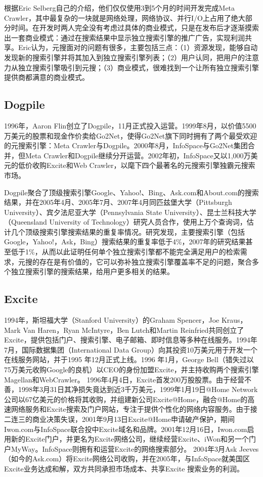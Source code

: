 根据Eric Selberg自己的介绍，他们仅仅使用3到5个月的时间开发完成Meta Crawler，其中最复杂的一块就是网络处理，网络协议、并行I/O上占用了绝大部分时间。在开发时两人完全没有考虑过具体的商业模式，只是在发布后才逐渐摸索出一套商业模式：通过在搜索结果中显示独立搜索引擎的推广广告，实现利润共享。Eric认为，元搜面对的问题有很多，主要包括三点：（1）资源发现，能够自动发现新的搜索引擎并将其加入到独立搜索引擎列表；（2）用户认同，把用户的注意力从独立搜索引擎吸引到元搜；（3）商业模式，很难找到一个让所有独立搜索引擎提供商都满意的商业模式。

\subsection{Dogpile}
1996年，Aaron Flin创立了Dogpile，11月正式投入运营。1999年8月，以价值5500万美元的股票和现金作价卖给Go2Net，使得Go2Net旗下同时拥有了两个最受欢迎的元搜索引擎：Meta Crawler与Dogpile。2000年8月，InfoSpace与Go2Net集团合并，但Meta Crawler和Dogpile继续分开运营。2002年初，InfoSpace又以1,000万美元的低价收购Excite和Web Crawler，以麾下四个最著名的元搜索引擎独霸元搜索市场。

Dogpile聚合了顶级搜索引擎Google、Yahoo!、Bing、Ask.com和About.com的搜索结果，并在2005年4月、2005年7月、2007年4月同匹兹堡大学（Pittsburgh University）、宾夕法尼亚大学（Pennsylvania State University）、昆士兰科技大学（Queensland University of Technology）研究人员合作，使用上万个查询词，估计几个顶级搜索引擎搜索结果的重复率情况。研究发现，主要搜索引擎（包括Google，Yahoo!，Ask，Bing）搜索结果的重复率低于4\%，2007年的研究结果甚至低于1\%，从而以此证明任何单个独立搜索引擎都不能完全满足用户的检索需求，元搜的存在是有价值的，它可以弥补独立搜索引擎覆盖率不足的问题，聚合多个独立搜索引擎的搜索结果，给用户更多相关的结果。

\subsection{Excite}
1994年，斯坦福大学（Stanford University）的Graham Spencer，Joe Kraus，Mark Van Haren，Ryan McIntyre，Ben Lutch和Martin Reinfried共同创立了Excite，提供包括门户、搜索引擎、电子邮箱、即时信息等多种在线服务。1994年7月，国际数据集团（International Data Group）向其投资10万美元用于开发一个在线服务网站，并于1995 年12月正式上线。1996 年1月，George Bell（错失过以75万美元收购Google的良机）以CEO的身份加盟Excite，并主持收购两个搜索引擎Magellan和WebCrawler。
1996年4月4日，Excite首发200万股股票。由于经营不善，1998年3月31日其净损失竟达到近3千万美元，1999年1月19日@Home Network公司以67亿美元的价格将其收购，并组建新公司Excite@Home，融合@Home的高速网络服务和Excite搜索及门户网站，专注于提供个性化的网络内容服务。由于接二连三的商业决策失误，2001年9月13日Excite@Home申请破产保护，期间Iwon.com与InfoSpace联合投中Excite域名和品牌。2001年12月16日，Iwon.com启用新的Excite门户，并更名为Excite网络公司，继续经营Excite、iWon和另一个门户MyWay。InfoSpace则拥有和运营Excite的网络搜索部分。
2004年3月Ask Jeeves（如今的Ask.com）将Excite网络公司收购，并在2005年，与InfoSpace就美国区Excite业务达成和解，双方共同承担市场成本、共享Excite 搜索业务的利润。


